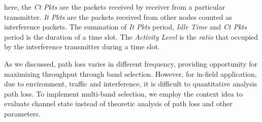 here, the \emph{Ct Pkts} are the packets received by receiver from a particular transmitter. 
	  \emph{It Pkts} are the packets received from other nodes counted as interference packets.
	  The summation of \emph{It Pkts} period, \emph{Idle Time} and \emph{Ct Pkts} period is the duration of a time slot.
	  The \emph{Activity Level} is the \emph{ratio} that occupied by the interference transmitter during a time slot. 






	  As we discussed, path loss varies in different frequency, providing opportunity for maximizing throughput through band selection. However, for in-field application, due to environment, traffic and interference, it is difficult to quantitative analysis path loss. 
	  To implement multi-band selection, we employ the context idea to evaluate channel state instead of theoretic analysis of path loss and other parameters. 

